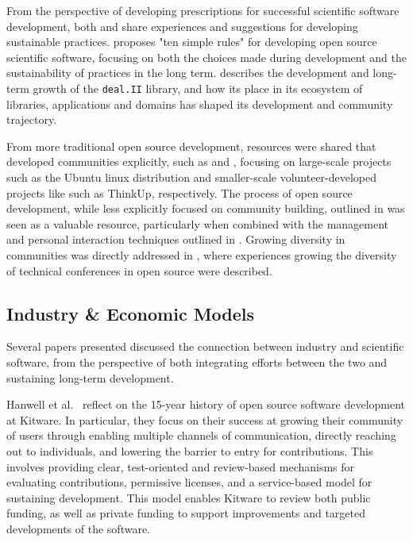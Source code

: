 \documentclass[11pt, oneside]{amsart}
\newcommand{\toolname}[1] {\textsf{#1}}
\begin{document}
From the perspective of developing prescriptions for successful scientific
software development, both \cite{citeulike:11831265} and
\cite{1749-4699-6-1-015010} share experiences and suggestions for developing
sustainable practices.  \cite{citeulike:11831265} proposes "ten simple rules"
for developing open source scientific software, focusing on both the choices
made during development and the sustainability of practices in the long term.  
\cite{1749-4699-6-1-015010} describes the development and long-term growth of
the \texttt{deal.II} library, and how its place in its ecosystem of libraries,
applications and domains has shaped its development and community trajectory.

From more traditional open source development, resources were shared that
developed communities explicitly, such as 
\cite{citeulike:7888211} and \cite{Trapani:2011}, focusing on
large-scale projects such as the Ubuntu linux distribution and smaller-scale
volunteer-developed projects like such as ThinkUp, respectively.
The process of open source development, while less explicitly focused on
community building, outlined in \cite{citeulike:478633} was seen as a valuable
resource, particularly when combined with the management and personal
interaction techniques outlined in \cite{opac-b1134063}.  Growing diversity in
communities was directly addressed in \cite{Allsopp:2012}, where experiences
growing the diversity of technical conferences in open source were described.

\subsection{Industry \& Economic Models}

Several papers presented discussed the connection between industry and
scientific software, from the perspective of both integrating efforts between
the two and sustaining long-term development.

Hanwell et al.~\cite{Hanwell_WSSSPE} reflect on the 15-year history of open
source software development at \toolname{Kitware}.  In particular, they focus on their
success at growing their community of users through enabling multiple channels
of communication, directly reaching out to individuals, and lowering the
barrier to entry for contributions. This involves providing clear,
test-oriented and review-based mechanisms for evaluating contributions,
permissive licenses, and a service-based model for sustaining development.
This model enables \toolname{Kitware} to review both public funding, as well as private
funding to support improvements and targeted developments of the software.
\end{document}
